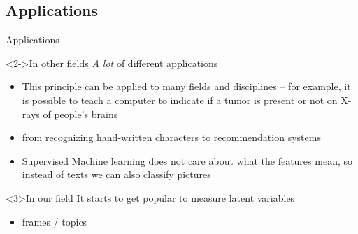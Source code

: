 \documentclass{beamer}
\begin{document}
\subsection{Applications}

\begin{frame}{Applications}
\begin{block}<2->{In other fields}
\emph{A lot} of different applications
\begin{itemize}
\item  This principle can be applied to many fields and disciplines -- for example, it is possible to teach a computer to indicate if a tumor is present or not on X-rays of people's brains
\item from recognizing hand-written characters to recommendation systems
\item  Supervised Machine learning does not care about what the features mean, so instead of texts we can also classify pictures
\end{itemize}
\end{block}

\begin{block}<3>{In our field}
It starts to get popular to measure latent variables
\begin{itemize}
\item frames / topics
\end{itemize}
\end{block}
\end{frame}
\end{document}
